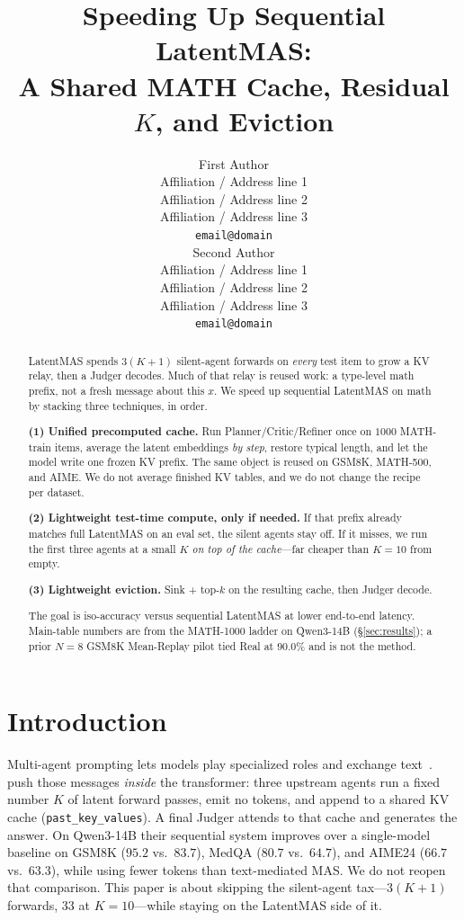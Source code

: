 \documentclass[11pt]{article}
\title{Speeding Up Sequential LatentMAS:\\
A Shared MATH Cache, Residual $K$, and Eviction}
\author{First Author \\
  Affiliation / Address line 1 \\
  Affiliation / Address line 2 \\
  Affiliation / Address line 3 \\
  \texttt{email@domain} \\\And
  Second Author \\
  Affiliation / Address line 1 \\
  Affiliation / Address line 2 \\
  Affiliation / Address line 3 \\
  \texttt{email@domain} \\}
\begin{document}
\maketitle
\begin{abstract}
LatentMAS spends $3(K{+}1)$ silent-agent forwards on \emph{every} test
item to grow a KV relay, then a Judger decodes.
Much of that relay is reused work: a type-level math prefix, not a
fresh message about this $x$.
We speed up sequential LatentMAS on math by stacking three techniques,
in order.

\textbf{(1) Unified precomputed cache.}
Run Planner/Critic/Refiner once on $1000$ MATH-train items, average the
latent embeddings \emph{by step}, restore typical length, and let the
model write one frozen KV prefix.
The same object is reused on GSM8K, MATH-500, and AIME.
We do not average finished KV tables, and we do not change the recipe
per dataset.

\textbf{(2) Lightweight test-time compute, only if needed.}
If that prefix already matches full LatentMAS on an eval set, the
silent agents stay off.
If it misses, we run the first three agents at a small $K$ \emph{on top
of the cache}---far cheaper than $K{=}10$ from empty.

\textbf{(3) Lightweight eviction.}
Sink + top-$k$ on the resulting cache, then Judger decode.

The goal is iso-accuracy versus sequential LatentMAS at lower
end-to-end latency.
Main-table numbers are from the MATH-1000 ladder on Qwen3-14B
(\S\ref{sec:results}); a prior $N{=}8$ GSM8K Mean-Replay pilot tied
Real at $90.0\%$ and is not the method.
\end{abstract}

\section{Introduction}
\label{sec:intro}

Multi-agent prompting lets models play specialized roles and exchange
text~\citep{du2023society,wu2023autogen,wei2022cot}.
\citet{zou2025latentmas} push those messages \emph{inside} the
transformer: three upstream agents run a fixed number $K$ of latent
forward passes, emit no tokens, and append to a shared KV cache
(\texttt{past\_key\_values}).
A final Judger attends to that cache and generates the answer.
On Qwen3-14B their sequential system improves over a single-model
baseline on GSM8K ($95.2$ vs.\ $83.7$), MedQA ($80.7$ vs.\ $64.7$), and
AIME24 ($66.7$ vs.\ $63.3$), while using fewer tokens than text-mediated
MAS.
We do not reopen that comparison.
This paper is about skipping the silent-agent tax---$3(K{+}1)$ forwards,
$33$ at $K{=}10$---while staying on the LatentMAS side of it.
\end{document}
